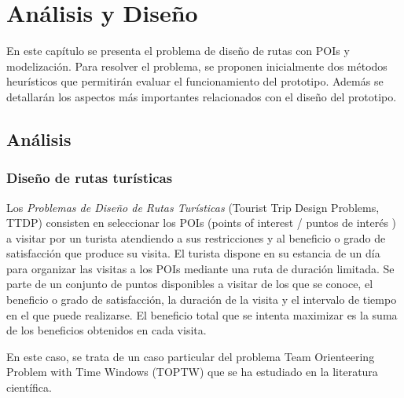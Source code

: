 \chapter{Análisis y Diseño}
En este capítulo se presenta el problema de diseño de rutas con POIs y modelización. Para resolver el problema, se proponen inicialmente dos métodos heurísticos que permitirán evaluar el funcionamiento del prototipo. Además se detallarán los aspectos más importantes relacionados con el diseño del prototipo.
\section[Análisis]{Análisis}
\subsection[Diseño de rutas turísticas]{Diseño de rutas turísticas}
Los \textit{Problemas de Diseño de Rutas Turísticas} (Tourist Trip Design Problems, TTDP) consisten en seleccionar los POIs (points of interest / puntos de interés ) a visitar por un turista atendiendo a sus restricciones y al beneficio o grado de satisfacción que produce su visita. El turista dispone en su estancia de un día para organizar las visitas a los POIs mediante una ruta de duración limitada. Se parte de un conjunto de puntos disponibles a visitar de los que se conoce, el beneficio o grado de satisfacción, la duración de la visita y el intervalo de tiempo en el que puede realizarse. El beneficio total que se intenta maximizar es la suma de los beneficios obtenidos en cada visita.\newline

En este caso, se trata de un caso particular del problema Team Orienteering Problem with Time Windows (TOPTW) que se ha estudiado en la literatura científica.\newline

